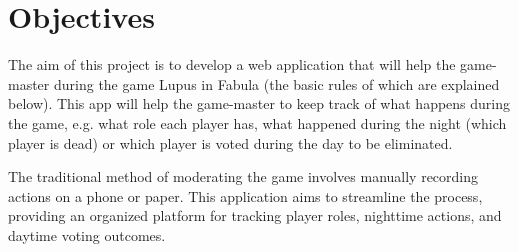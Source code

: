

\section{Objectives}


The aim of this project is to develop a web application that will help the game-master during the game Lupus in Fabula (the basic rules of which are explained below).
This app will help the game-master to keep track of what happens during the game, e.g. what role each player has, what happened during the night (which player is dead) or which player is voted during the day to be eliminated.

The traditional method of moderating the game involves manually recording actions on a phone or paper. This application aims to streamline the process, providing an organized platform for tracking player roles, nighttime actions, and daytime voting outcomes.\\

